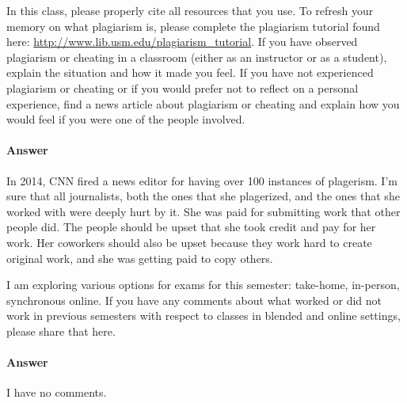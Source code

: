 \documentclass{article}
\begin{document}
In this class, please properly cite all resources that you use.  To refresh your
memory on what plagiarism is, please complete the plagiarism tutorial found
here: \url{http://www.lib.usm.edu/plagiarism_tutorial}.  If you have observed
plagiarism or cheating in a classroom (either as an instructor or as a student),
explain the situation and how it made you feel.  If you have not experienced
plagiarism or cheating or if you would prefer not to reflect on a personal
experience, find a news article about plagiarism or cheating and explain how you
would feel if you were one of the people involved.

	\paragraph{Answer} In 2014, CNN fired a news editor for having over 100 instances of plagerism. 
I'm sure that all journalists, both the ones that she plagerized, and the ones 
that she worked with were deeply hurt by it. She was paid for submitting work
that other people did. The people should be upset that she took credit and pay 
for her work. Her coworkers should also be upset because they work hard to
create original work, and she was getting paid to copy others.

\parbox[t]{\linewidth}{\hangindent=5mm }


I am exploring various options for exams for this semester: take-home,
in-person, synchronous online.  If you have any comments about what worked or
did not work in previous semesters with respect to classes in blended and online
settings, please share that here.

	\paragraph{Answer} I have no comments.




\end{document}
